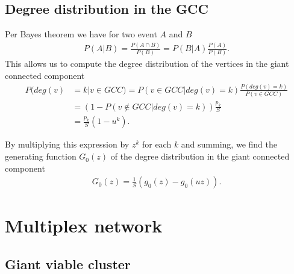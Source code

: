 \documentclass[
11pt, %
english, %
singlespacing, %
liststotoc, %
headsepline, %
]{MastersDoctoralThesis} %
\begin{document}
\newpage



\section{Degree distribution in the GCC}
\label{Section: Degree distribution in the GCC}

Per Bayes theorem we have for two event $A$ and $B$
\begin{align}
	P(A | B) = \frac{P(A \cap B)}{ P(B)} = P(B | A) \frac{P(A)}{P(B)}. \label{Bayes theorem}
\end{align}
This allows us to compute the degree distribution of the vertices in the giant connected component
\begin{align}
	P(deg(v) &= k | v \in GCC) = P(v \in GCC | deg(v) = k) \frac{P(deg(v) = k)}{P(v \in GCC)} \\
	&= (1 - P(v \notin GCC|deg(v) = k)) \frac{p_k}{S} \\
	&= \frac{p_k}{S} (1 - u^k). \label{Degree distribution in GCC}
\end{align}

\begin{figure}
\end{figure}

By multiplying this expression by $z^k$ for each $k$ and summing, we find the generating function $G_0(z)$ of the degree distribution in the giant connected component
\begin{align}
	G_0(z) = \frac{1}{S} (g_0(z) - g_0(u z)).
\end{align}


\chapter{Multiplex network}

\section{Giant viable cluster}
\end{document}
